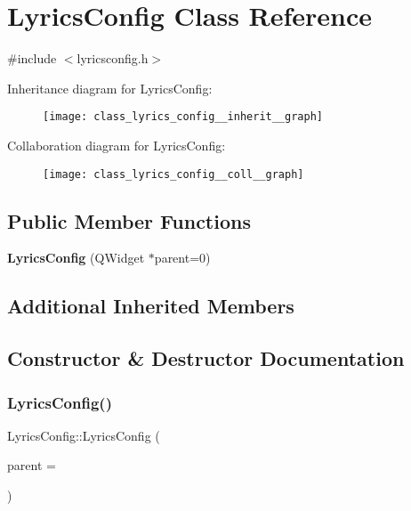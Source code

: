\section{Lyrics\+Config Class Reference}
\label{class_lyrics_config}


{\ttfamily \#include $<$lyricsconfig.\+h$>$}



Inheritance diagram for Lyrics\+Config\+:\nopagebreak
\begin{figure}[H]
\begin{center}
\leavevmode
\texttt{[image: class\_lyrics\_config\_\_inherit\_\_graph]}
\end{center}
\end{figure}


Collaboration diagram for Lyrics\+Config\+:\nopagebreak
\begin{figure}[H]
\begin{center}
\leavevmode
\texttt{[image: class\_lyrics\_config\_\_coll\_\_graph]}
\end{center}
\end{figure}
\subsection*{Public Member Functions}
\begin{DoxyCompactItemize}
\item 
\textbf{ Lyrics\+Config} (Q\+Widget $\ast$parent=0)
\end{DoxyCompactItemize}
\subsection*{Additional Inherited Members}


\subsection{Constructor \& Destructor Documentation}
\mbox{\label{class_lyrics_config_ab8f6a699a7c15a192d1d145c5c3aa772}} 
\subsubsection{Lyrics\+Config()}
{\footnotesize\ttfamily Lyrics\+Config\+::\+Lyrics\+Config (\begin{DoxyParamCaption}\item[{Q\+Widget $\ast$}]{parent = {} }\end{DoxyParamCaption})}

